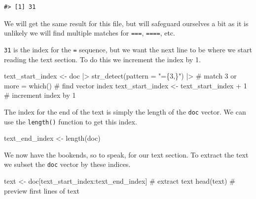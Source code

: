 \documentclass[
  letterpaper,
]{latex/krantz}
\newenvironment{Shaded}{\begin{snugshade}}{\end{snugshade}}
\newcommand{\AttributeTok}[1]{\textcolor[rgb]{0.40,0.45,0.13}{#1}}
\newcommand{\CommentTok}[1]{\textcolor[rgb]{0.37,0.37,0.37}{#1}}
\newcommand{\DecValTok}[1]{\textcolor[rgb]{0.68,0.00,0.00}{#1}}
\newcommand{\FunctionTok}[1]{\textcolor[rgb]{0.28,0.35,0.67}{#1}}
\newcommand{\NormalTok}[1]{\textcolor[rgb]{0.00,0.23,0.31}{#1}}
\newcommand{\OtherTok}[1]{\textcolor[rgb]{0.00,0.23,0.31}{#1}}
\newcommand{\SpecialCharTok}[1]{\textcolor[rgb]{0.37,0.37,0.37}{#1}}
\newcommand{\StringTok}[1]{\textcolor[rgb]{0.13,0.47,0.30}{#1}}
\begin{document}
\begin{verbatim}
#> [1] 31
\end{verbatim}

We will get the same result for this file, but will safeguard ourselves
a bit as it is unlikely we will find multiple matches for \texttt{===},
\texttt{====}, etc.

\texttt{31} is the index for the \texttt{=} sequence, but we want the
next line to be where we start reading the text section. To do this we
increment the index by 1.

\begin{Shaded}
\begin{Highlighting}[]
\NormalTok{text\_start\_index }\OtherTok{\textless{}{-}} 
\NormalTok{  doc }\SpecialCharTok{|\textgreater{}} 
  \FunctionTok{str\_detect}\NormalTok{(}\AttributeTok{pattern =} \StringTok{"=\{3,\}"}\NormalTok{) }\SpecialCharTok{|\textgreater{}} \CommentTok{\# match 3 or more \textasciigrave{}=\textasciigrave{} }
  \FunctionTok{which}\NormalTok{() }\CommentTok{\# find vector index}
\NormalTok{text\_start\_index }\OtherTok{\textless{}{-}}\NormalTok{ text\_start\_index }\SpecialCharTok{+} \DecValTok{1} \CommentTok{\# increment index by 1}
\end{Highlighting}
\end{Shaded}

The index for the end of the text is simply the length of the
\texttt{doc} vector. We can use the \texttt{length()} function to get
this index.

\begin{Shaded}
\begin{Highlighting}[]
\NormalTok{text\_end\_index }\OtherTok{\textless{}{-}} \FunctionTok{length}\NormalTok{(doc)}
\end{Highlighting}
\end{Shaded}

We now have the bookends, so to speak, for our text section. To extract
the text we subset the \texttt{doc} vector by these indices.

\begin{Shaded}
\begin{Highlighting}[]
\NormalTok{text }\OtherTok{\textless{}{-}}\NormalTok{ doc[text\_start\_index}\SpecialCharTok{:}\NormalTok{text\_end\_index] }\CommentTok{\# extract text}
\FunctionTok{head}\NormalTok{(text) }\CommentTok{\# preview first lines of \textasciigrave{}text\textasciigrave{}}
\end{Highlighting}
\end{Shaded}
\end{document}
